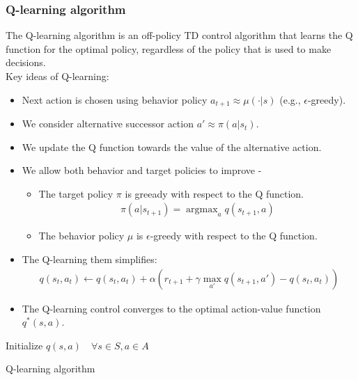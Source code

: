 \documentclass[11pt]{book} %
\DeclareMathOperator*{\argmax}{argmax}
\begin{document}
\subsubsection{Q-learning algorithm}
The Q-learning algorithm is an off-policy TD control algorithm that learns the Q function for the optimal policy,
regardless of the policy that is used to make decisions. \\
Key ideas of Q-learning:
\begin{itemize}
    \item Next action is chosen using behavior policy $a_{t+1} \approx \mu(\cdot|s)$ (e.g., $\epsilon$-greedy).
    \item We consider alternative successor action $a' \approx  \pi(a| s_{t})$.
    \item We update the Q function towards the value of the alternative action.
    \item We allow both behavior and target policies to improve -
    \begin{itemize}
        \item The target policy $\pi$ is greeady with respect to the Q function.
        \begin{align*}
            \pi(a|s_{t+1}) = \argmax_{a} q(s_{t+1}, a)
        \end{align*}
        \item The behavior policy $\mu$ is $\epsilon$-greedy with respect to the Q function.
    \end{itemize}
    \item The Q-learning them simplifies:
    \begin{align*}
        q(s_t, a_t) \leftarrow q(s_t, a_t) + \alpha (r_{t+1} + \gamma \max_{a'} q(s_{t+1}, a') - q(s_t, a_t))
    \end{align*}
    \item The Q-learning control converges to the optimal action-value function $q^*(s, a)$.
\end{itemize}

\begin{algorithm}[H]
    \SetNoFillComment
    \SetAlgoLined
    Initialize $q(s, a) \quad \forall s \in S, a \in A$ \\
    \caption{Q-learning algorithm} \label{Q-learning algorithm}
\end{algorithm}
\end{document}
